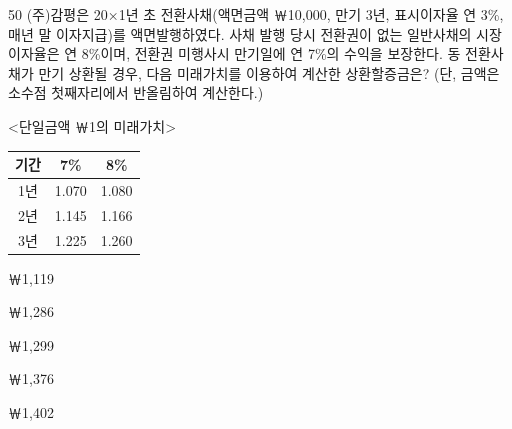\begin{question}{50}
(주)감평은 20×1년 초 전환사채(액면금액 ￦10,000, 만기 3년, 표시이자율 연 3\%, 매년 말 이자지급)를 액면발행하였다. 사채 발행 당시 전환권이 없는 일반사채의 시장이자율은 연 8\%이며, 전환권 미행사시 만기일에 연 7\%의 수익을 보장한다. 동 전환사채가 만기 상환될 경우, 다음 미래가치를 이용하여 계산한 상환할증금은? (단, 금액은 소수점 첫째자리에서 반올림하여 계산한다.)
\par{\small\centering <단일금액 ￦1의 미래가치> \par
\begin{tabular}{|c|c|c|}\hline
기간 & 7\% & 8\% \\ \hline
1년 & 1.070 & 1.080 \\ \hline
2년 & 1.145 & 1.166 \\ \hline
3년 & 1.225 & 1.260 \\ \hline
\end{tabular}\par}
\begin{choices}
  \item ￦1,119
  \item ￦1,286
  \item ￦1,299
  \item ￦1,376
  \item ￦1,402
\end{choices}
\end{question}
